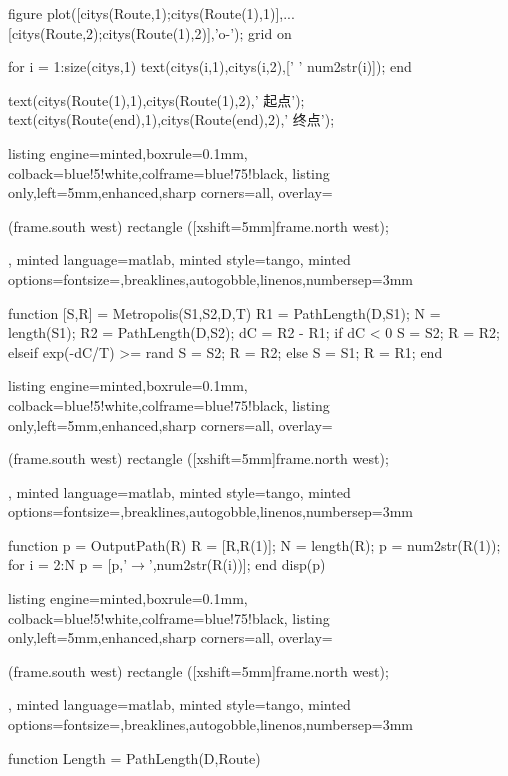 \documentclass{article}
\begin{document}
\begin{homeworkProblem}
\begin{tcblisting}
    figure
    plot([citys(Route,1);citys(Route(1),1)],...
         [citys(Route,2);citys(Route(1),2)],'o-');
    grid on
    
    for i = 1:size(citys,1)
        text(citys(i,1),citys(i,2),['   ' num2str(i)]);
    end
    
    text(citys(Route(1),1),citys(Route(1),2),'       起点');
    text(citys(Route(end),1),citys(Route(end),2),'       终点');    
\end{tcblisting}
\begin{tcblisting}{listing engine=minted,boxrule=0.1mm,
    colback=blue!5!white,colframe=blue!75!black,
    listing only,left=5mm,enhanced,sharp corners=all,
    overlay={\begin{tcbclipinterior} (frame.south west)
    rectangle ([xshift=5mm]frame.north west);\end{tcbclipinterior}},
    minted language=matlab,
    minted style=tango,
    minted options={fontsize=\small,breaklines,autogobble,linenos,numbersep=3mm}}
function [S,R] = Metropolis(S1,S2,D,T)
R1 = PathLength(D,S1);  %
N = length(S1);         %
R2 = PathLength(D,S2);  %
dC = R2 - R1;   %
if dC < 0       %
    S = S2;
    R = R2;
elseif exp(-dC/T) >= rand   %
    S = S2;
    R = R2;
else        %
    S = S1;
    R = R1;
end
\end{tcblisting}
\begin{tcblisting}{listing engine=minted,boxrule=0.1mm,
    colback=blue!5!white,colframe=blue!75!black,
    listing only,left=5mm,enhanced,sharp corners=all,
    overlay={\begin{tcbclipinterior} (frame.south west)
    rectangle ([xshift=5mm]frame.north west);\end{tcbclipinterior}},
    minted language=matlab,
    minted style=tango,
    minted options={fontsize=\small,breaklines,autogobble,linenos,numbersep=3mm}}
    function p = OutputPath(R)
    R = [R,R(1)];
    N = length(R);
    p = num2str(R(1));
    for i = 2:N
        p = [p,'$\to $',num2str(R(i))];
    end
    disp(p)    
\end{tcblisting}
\begin{tcblisting}{listing engine=minted,boxrule=0.1mm,
    colback=blue!5!white,colframe=blue!75!black,
    listing only,left=5mm,enhanced,sharp corners=all,
    overlay={\begin{tcbclipinterior} (frame.south west)
    rectangle ([xshift=5mm]frame.north west);\end{tcbclipinterior}},
    minted language=matlab,
    minted style=tango,
    minted options={fontsize=\small,breaklines,autogobble,linenos,numbersep=3mm}}
    function Length = PathLength(D,Route)
    

\end{tcblisting}
\end{homeworkProblem}
\end{document}
